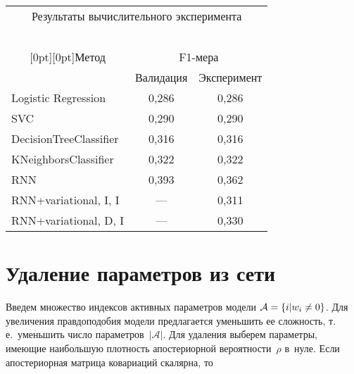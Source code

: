 \begin{multicols}{2}
{\small %
    \begin{center}
\vspace*{6pt}
    \begin{tabular}{|l|c|c|}
    \multicolumn{3}{c}{Результаты вычислительного эксперимента}\\
    \multicolumn{3}{c}{\ }\\[-6pt]
        \hline %
       \multicolumn{1}{|c|}{\raisebox{-6pt}[0pt][0pt]{Метод}}          & \multicolumn{2}{c|}{F1-мера}\\
        \cline{2-3}
& Валидация &  Эксперимент \\ 
\hline
        Logistic Regression    & 0,286                 & 0,286            \\ 
        SVC                    & 0,290                 & 0,290            \\ 
        DecisionTreeClassifier & 0,316                 & 0,316            \\ 
        KNeighborsClassifier   & 0,322                 & 0,322            \\ 
        RNN                    & 0,393                 & 0,362            \\ 
        RNN+variational, I, I  &  ---                     & 0,311            
\\ 
        RNN+variational, D, I  &  ---                     & 0,330           \\ 
\hline
    \end{tabular}
        \vspace*{3pt}
    \end{center}
}







\section{Удаление параметров из сети}

\vspace*{-14pt}

Введем множество индексов активных па\-ра\-мет\-ров модели $\mathcal{A} \hm= \{i | w_i 
\neq 0\} $. Для увеличения правдоподобия модели предлагается уменьшить ее 
сложность, т.\,е.\ уменьшить число параметров~$|\mathcal{A}|$. Для удаления 
выберем параметры, имеющие наибольшую плотность апостериорной вероятности~$\rho$ 
в~нуле.
Если апостериорная матрица ковариаций скалярна, то


\end{multicols}
